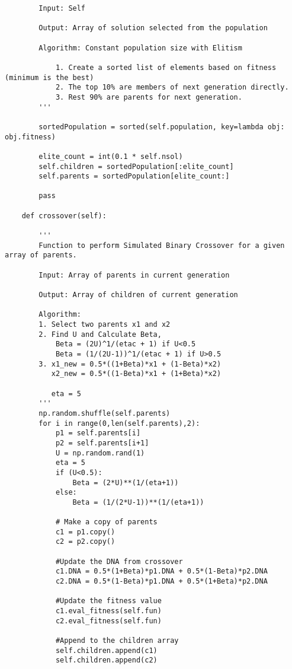 \documentclass[12pt,a4paper,oneside]{paper} %
\begin{document}
\begin{verbatim}
        Input: Self

        Output: Array of solution selected from the population

        Algorithm: Constant population size with Elitism

            1. Create a sorted list of elements based on fitness (minimum is the best)
            2. The top 10% are members of next generation directly.
            3. Rest 90% are parents for next generation.
        '''

        sortedPopulation = sorted(self.population, key=lambda obj: obj.fitness)

        elite_count = int(0.1 * self.nsol)
        self.children = sortedPopulation[:elite_count]
        self.parents = sortedPopulation[elite_count:]

        pass

    def crossover(self):

        '''
        Function to perform Simulated Binary Crossover for a given array of parents.

        Input: Array of parents in current generation

        Output: Array of children of current generation

        Algorithm: 
        1. Select two parents x1 and x2
        2. Find U and Calculate Beta,
            Beta = (2U)^1/(etac + 1) if U<0.5
            Beta = (1/(2U-1))^1/(etac + 1) if U>0.5
        3. x1_new = 0.5*((1+Beta)*x1 + (1-Beta)*x2)
           x2_new = 0.5*((1-Beta)*x1 + (1+Beta)*x2)
           
           eta = 5
        '''
        np.random.shuffle(self.parents)
        for i in range(0,len(self.parents),2):
            p1 = self.parents[i]
            p2 = self.parents[i+1]
            U = np.random.rand(1)
            eta = 5
            if (U<0.5):
                Beta = (2*U)**(1/(eta+1))
            else:
                Beta = (1/(2*U-1))**(1/(eta+1))
            
            # Make a copy of parents
            c1 = p1.copy()
            c2 = p2.copy()

            #Update the DNA from crossover
            c1.DNA = 0.5*(1+Beta)*p1.DNA + 0.5*(1-Beta)*p2.DNA
            c2.DNA = 0.5*(1-Beta)*p1.DNA + 0.5*(1+Beta)*p2.DNA

            #Update the fitness value
            c1.eval_fitness(self.fun)
            c2.eval_fitness(self.fun)

            #Append to the children array
            self.children.append(c1)
            self.children.append(c2)
        

\end{verbatim}
\end{document}
